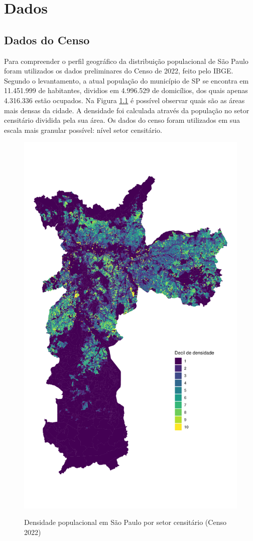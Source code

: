 \chapter{Dados}
\label{sec:dados}

\section{Dados do Censo}

Para compreender o perfil geográfico da distribuição populacional de São Paulo foram utilizados os dados preliminares do Censo de 2022, feito pelo IBGE. Segundo o levantamento, a atual população do município de SP se encontra em 11.451.999 de habitantes, dividios em 4.996.529 de domicílios, dos quais apenas 4.316.336 estão ocupados. Na Figura \ref{fig:populacao} é possível observar quais são as áreas mais densas da cidade. A densidade foi calculada através da população no setor censitário dividida pela sua área. Os dados do censo foram utilizados em sua escala mais granular possível: nível setor censitário. 

\begin{figure}[!h]
    \centering
    \caption{Densidade populacional em São Paulo por setor censitário (Censo 2022)}
    \includegraphics[width = .85\linewidth]{imagens/mapa.pdf}
    \label{fig:populacao}
\end{figure}


